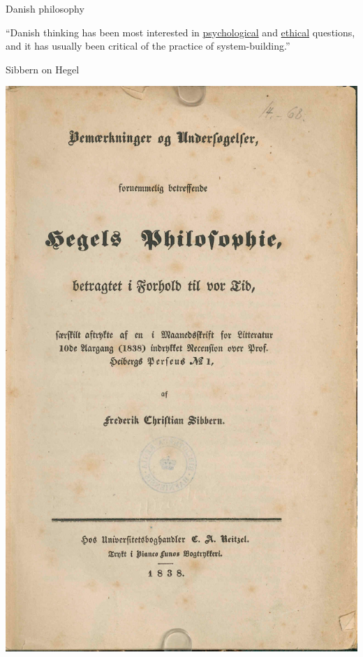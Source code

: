 \documentclass[fleqn]{beamer}
\begin{document}
\begin{frame}{Danish philosophy}

  ``Danish thinking has been most interested in
  \underline{psychological} and \underline{ethical} questions, and it
  has usually been critical of the practice of system-building.''
  \citep[2]{hoffding1909}


\end{frame}

\begin{frame}{Sibbern on Hegel}

  \includegraphics[scale=0.4]{hegels-philosophie.pdf}

\end{frame}
\end{document}

